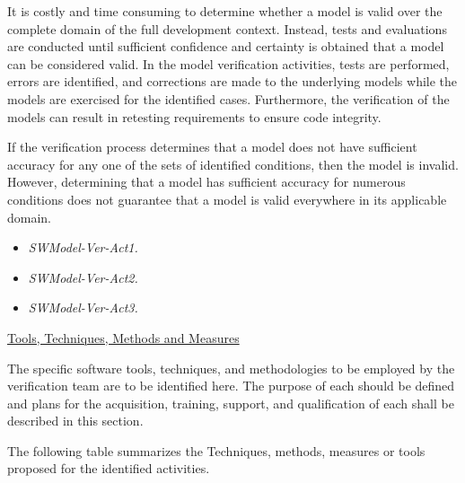 \documentclass{template/openetcs_report}
\begin{document}
It is costly and time consuming to determine whether a model is valid over the complete domain of the full development context. Instead, tests and evaluations are conducted until sufficient confidence and certainty is obtained that a model can be considered valid. In the model verification activities, tests are performed, errors are identified, and corrections are made to the underlying models while the models are exercised for the identified cases. Furthermore, the verification of the models can result in retesting requirements to ensure code integrity.

If the verification process determines that a model does not have sufficient accuracy for any one of the sets of identified conditions, then the model is invalid. However, determining that a model has sufficient accuracy for numerous conditions does not guarantee that a model is valid everywhere in its applicable domain. 

\begin{itemize}
\item {\it SWModel-Ver-Act1.} 
\item {\it SWModel-Ver-Act2. }  
\item {\it SWModel-Ver-Act3. }
\end{itemize}

\underline{Tools, Techniques, Methods and Measures} 

The specific software tools, techniques, and methodologies to be
employed by the verification team are to be identified here. 
The purpose of each should be defined and plans for the acquisition,
training, support, and qualification of each shall be described in
this section. 

The following table summarizes the Techniques, methods, measures or tools proposed for the identified activities.
\end{document}
